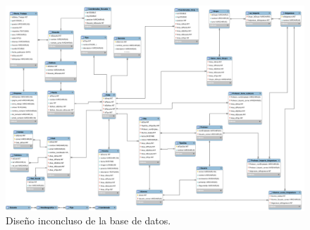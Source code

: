 \documentclass[oneside,10pt]{book}
\begin{document}
	\begin{figure}[htbp!]
		\centering
			\includegraphics[width=1\textwidth]{images/baseDeDatos}
		\caption{Diseño inconcluso de la base de datos.}
	\end{figure}



\end{document}
